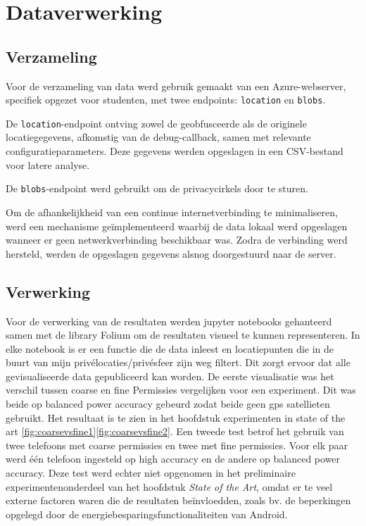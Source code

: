 \section{Dataverwerking}
\subsection{Verzameling}
Voor de verzameling van data werd gebruik gemaakt van een Azure-webserver, specifiek opgezet voor studenten, met twee endpoints: \texttt{location} en \texttt{blobs}. 

De \texttt{location}-endpoint ontving zowel de geobfusceerde als de originele locatiegegevens, afkomstig van de debug-callback, samen met relevante configuratieparameters. Deze gegevens werden opgeslagen in een CSV-bestand voor latere analyse. 

De \texttt{blobs}-endpoint werd gebruikt om de privacycirkels door te sturen. 

Om de afhankelijkheid van een continue internetverbinding te minimaliseren, werd een mechanisme geïmplementeerd waarbij de data lokaal werd opgeslagen wanneer er geen netwerkverbinding beschikbaar was. Zodra de verbinding werd hersteld, werden de opgeslagen gegevens alsnog doorgestuurd naar de server.
\subsection{Verwerking}
Voor de verwerking van de resultaten werden jupyter notebooks gehanteerd samen met de library Folium \cite{folium} om de resultaten visueel te kunnen representeren. 
In elke notebook is er een functie die de data inleest en locatiepunten die in de buurt van mijn privélocaties/privésfeer zijn weg filtert. Dit zorgt ervoor dat alle gevisualiseerde data gepubliceerd kan worden.
De eerste visualisatie was het verschil tussen coarse en fine Permissies vergelijken voor een experiment. Dit was beide op balanced power accuracy gebeurd zodat beide geen \gls{gps} satellieten gebruikt. Het resultaat is te zien in het hoofdstuk experimenten in state of the art \ref{fig:coarsevsfine1}\ref{fig:coarsevsfine2}.
Een tweede test betrof het gebruik van twee telefoons met coarse permissies en twee met fine permissies. Voor elk paar werd één telefoon ingesteld op high accuracy en de andere op balanced power accuracy. Deze test werd echter niet opgenomen in het preliminaire experimentenonderdeel van het hoofdstuk \textit{State of the Art}, omdat er te veel externe factoren waren die de resultaten beïnvloedden, zoals bv. de beperkingen opgelegd door de energiebesparingsfunctionaliteiten van Android.

